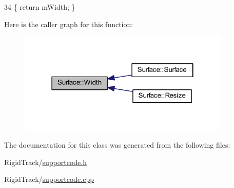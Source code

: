 \begin{DoxyCode}
34 \{ \textcolor{keywordflow}{return} mWidth;  \}
\end{DoxyCode}
Here is the caller graph for this function\+:
\nopagebreak
\begin{figure}[H]
\begin{center}
\leavevmode
\includegraphics[width=286pt]{class_surface_ae76d7c2fa208df6979a77cc60e8105c0_icgraph}
\end{center}
\end{figure}


The documentation for this class was generated from the following files\+:\begin{DoxyCompactItemize}
\item 
Rigid\+Track/\hyperlink{supportcode_8h}{supportcode.\+h}\item 
Rigid\+Track/\hyperlink{supportcode_8cpp}{supportcode.\+cpp}\end{DoxyCompactItemize}
